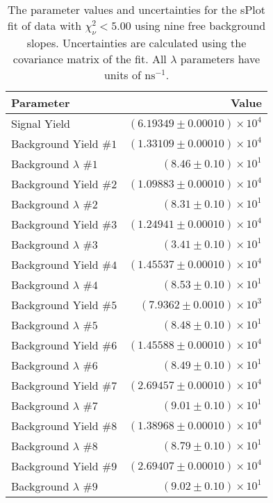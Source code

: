 
\begin{table}[ht]
    \begin{center}
        \begin{tabular}{lr}\toprule
            Parameter & Value \\\midrule
            Signal Yield & $(6.19349 \pm 0.00010) \times 10^{4}$ \\
            Background Yield $\#1$ & $(1.33109 \pm 0.00010) \times 10^{4}$ \\
            Background $\lambda$ $\#1$ & $(8.46 \pm 0.10) \times 10^{1}$ \\
            Background Yield $\#2$ & $(1.09883 \pm 0.00010) \times 10^{4}$ \\
            Background $\lambda$ $\#2$ & $(8.31 \pm 0.10) \times 10^{1}$ \\
            Background Yield $\#3$ & $(1.24941 \pm 0.00010) \times 10^{4}$ \\
            Background $\lambda$ $\#3$ & $(3.41 \pm 0.10) \times 10^{1}$ \\
            Background Yield $\#4$ & $(1.45537 \pm 0.00010) \times 10^{4}$ \\
            Background $\lambda$ $\#4$ & $(8.53 \pm 0.10) \times 10^{1}$ \\
            Background Yield $\#5$ & $(7.9362 \pm 0.0010) \times 10^{3}$ \\
            Background $\lambda$ $\#5$ & $(8.48 \pm 0.10) \times 10^{1}$ \\
            Background Yield $\#6$ & $(1.45588 \pm 0.00010) \times 10^{4}$ \\
            Background $\lambda$ $\#6$ & $(8.49 \pm 0.10) \times 10^{1}$ \\
            Background Yield $\#7$ & $(2.69457 \pm 0.00010) \times 10^{4}$ \\
            Background $\lambda$ $\#7$ & $(9.01 \pm 0.10) \times 10^{1}$ \\
            Background Yield $\#8$ & $(1.38968 \pm 0.00010) \times 10^{4}$ \\
            Background $\lambda$ $\#8$ & $(8.79 \pm 0.10) \times 10^{1}$ \\
            Background Yield $\#9$ & $(2.69407 \pm 0.00010) \times 10^{4}$ \\
            Background $\lambda$ $\#9$ & $(9.02 \pm 0.10) \times 10^{1}$ \\\bottomrule
        \end{tabular}
        \caption{The parameter values and uncertainties for the sPlot fit of data with $\chi^2_\nu < 5.00$ using nine free background slopes. Uncertainties are calculated using the covariance matrix of the fit. All $\lambda$ parameters have units of $\si{\nano\second}^{-1}$.}\label{tab:splot-fit-results-chisqdof-5.00-free-9}
    \end{center}
\end{table}
